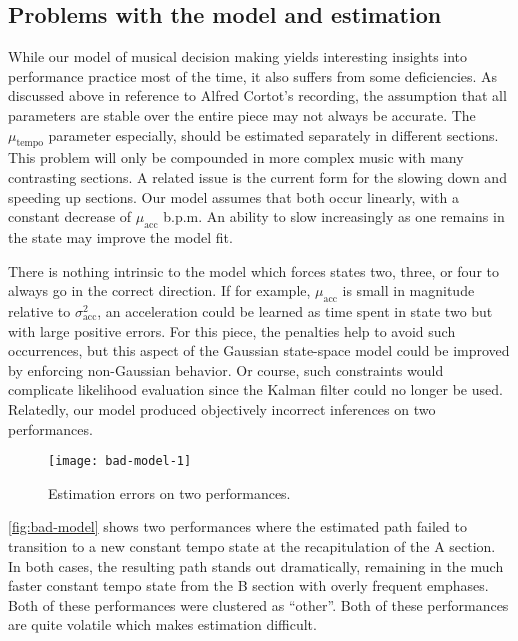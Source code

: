 \documentclass[12pt]{article}
\begin{document}
\subsection{Problems with the model and estimation}
\label{sec:problems-with-model}

While our model of musical decision making yields interesting insights
into performance practice most of the time, it also suffers from some
deficiencies. As discussed above in reference to Alfred Cortot's
recording, the assumption that all parameters are stable over the
entire piece may not always be accurate. The $\mu_{\textrm{tempo}}$
parameter especially, should be estimated separately in different
sections. This problem will only be compounded in more complex music
with many contrasting sections. A related issue is the current form
for the slowing down and speeding up sections. Our model assumes that
both occur linearly, with a constant decrease of $\mu_{\textrm{acc}}$
b.p.m. An ability to slow increasingly as one remains in the state may
improve the model fit.

There is nothing intrinsic to the model which forces states two,
three, or four to always go in the correct direction. If for example,
$\mu_{\textrm{acc}}$ is small in magnitude relative to
$\sigma^2_{\textrm{acc}}$, an acceleration could be learned as time
spent in state two but with large positive errors. For this piece, the
penalties help to avoid such occurrences, but this aspect of the
Gaussian state-space model could be improved by enforcing non-Gaussian
behavior. Or course, such constraints would complicate likelihood
evaluation since the Kalman filter could no longer be used. Relatedly,
our model produced objectively incorrect inferences on two performances.
\begin{figure}[t]
  \centering
  \texttt{[image: bad-model-1]}
  \caption{Estimation errors on two performances.}
  \label{fig:bad-model}
\end{figure}
\autoref{fig:bad-model} shows two performances where the estimated
path failed to transition to a new constant tempo state at the
recapitulation of the A section. In both cases, the resulting path
stands out dramatically, remaining in the much faster constant tempo
state from the B section with overly frequent emphases. Both of these
performances were clustered as ``other''. Both of these performances
are quite volatile which makes estimation difficult.

\end{document}
